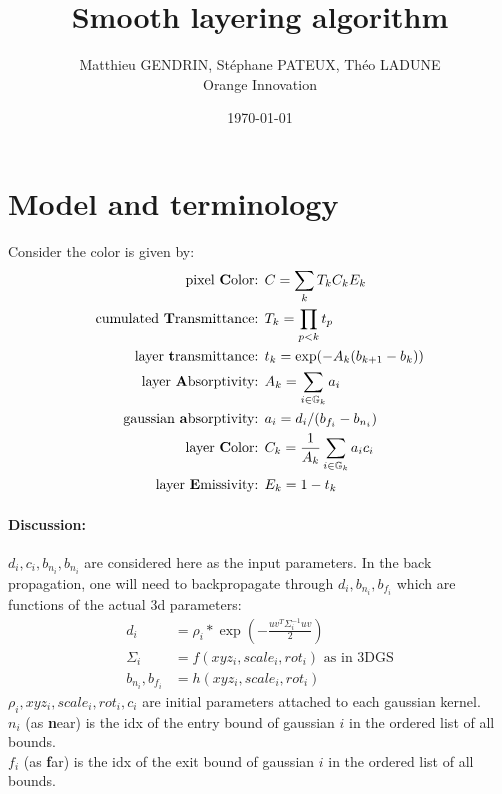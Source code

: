 \documentclass{article}
\title{Smooth layering algorithm}
\author{Matthieu GENDRIN, Stéphane PATEUX, Théo LADUNE \\
	Orange Innovation
	}
\date{\today}
\begin{document}
\maketitle

\section{Model and terminology}

Consider the color is given by:
\begin{align}
    \label{model}
    \text{pixel \textbf{C}olor: } & C = \sum_{k} T_k C_k E_k \\
    \text{cumulated \textbf{T}ransmittance: } & T_k = \prod_{p<k} t_p \nonumber \\
    \text{layer \textbf{t}ransmittance: } & t_k = \exp(-A_k (b_{k+1}-b_k)) \nonumber \\
    \text{layer \textbf{A}bsorptivity: } & A_k = \sum_{i \in \mathbb{G}_k} a_i \nonumber \\
    \text{gaussian \textbf{a}bsorptivity: } & a_i = d_i / (b_{f_i}-b_{n_i}) \nonumber \\
    \text{layer \textbf{C}olor: } & C_k = \frac{1}{A_k} \sum_{i \in \mathbb{G}_k} a_i c_i \nonumber \\
    \text{layer \textbf{E}missivity: } & E_k = 1 - t_k \nonumber
\end{align}

\paragraph{Discussion:}
$d_i, c_i, b_{n_i}, b_{n_i}$ are considered here as the input parameters. In the back propagation, one will need to 
backpropagate through $d_i, b_{n_i}, b_{f_i}$ which are functions of the actual 3d parameters:
\begin{align}
    d_i & = \rho_i * \exp(-\frac{uv^T\Sigma_i^{-1}uv}{2}) \nonumber \\
    \Sigma_i & = f(xyz_i, scale_i, rot_i) \text{ as in 3DGS} \nonumber \\
    b_{n_i}, b_{f_i} & = h(xyz_i, scale_i, rot_i) \nonumber
\end{align}
$\rho_i, xyz_i, scale_i, rot_i, c_i$ are initial parameters attached to each gaussian kernel. \\
$n_i$ (as \textbf{n}ear) is the idx of the entry bound of gaussian $i$ in the ordered list of all bounds. \\
$f_i$ (as \textbf{f}ar) is the idx of the exit bound of gaussian $i$ in the ordered list of all bounds.
\end{document}
